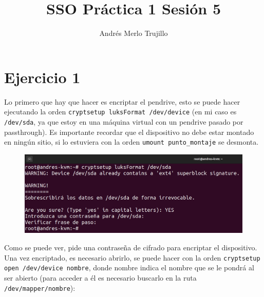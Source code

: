 \documentclass{article}
\title{SSO Práctica 1 Sesión 5}
\author{Andrés Merlo Trujillo}
\date{}
\begin{document}
\maketitle

\tableofcontents

\newpage


\section*{Ejercicio 1}

Lo primero que hay que hacer es encriptar el pendrive, esto se puede hacer ejecutando la orden \verb|cryptsetup luksFormat /dev/device| (en mi caso es \verb|/dev/sda|, ya que estoy en una máquina virtual con un pendrive pasado por passthrough). Es importante recordar que el dispositivo no debe estar montado en ningún sitio, si lo estuviera con la orden \verb|umount punto_montaje| se desmonta.

\begin{figure}[H]
    \includegraphics[width=\textwidth]{imagenes/Captura desde 2022-10-30 10-51-54.png}
\end{figure}

\bigskip

Como se puede ver, pide una contraseña de cifrado para encriptar el dispositivo. Una vez encriptado, es necesario abrirlo, se puede hacer con la orden \verb|cryptsetup open /dev/device nombre|, donde nombre indica el nombre que se le pondrá al ser abierto (para acceder a él es necesario buscarlo en la ruta \verb|/dev/mapper/nombre|):
\end{document}
